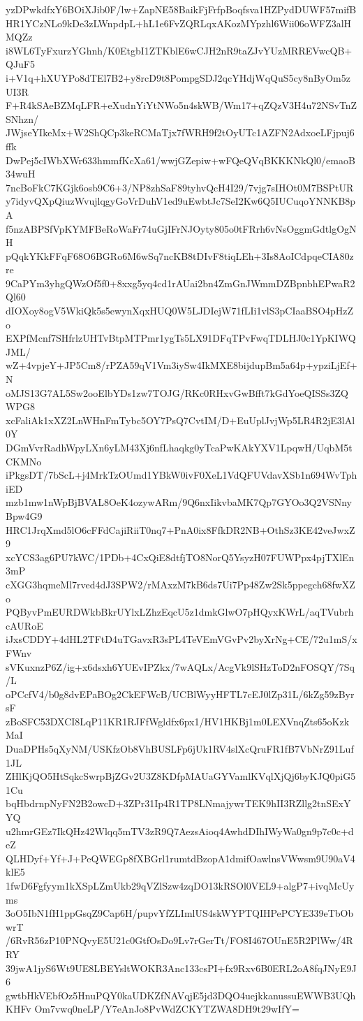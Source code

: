 yzDPwkdfxY6BOiXJib0F/lw+ZapNE58BaikFjFrfpBoqfsva1HZPydDUWF57mifB
HR1YCzNLo9kDe3zLWnpdpL+hL1e6FvZQRLqxAKozMYpzhl6Wii06oWFZ3alHMQZz
i8WL6TyFxurzYGhnh/K0EtgbI1ZTKblE6wCJH2nR9taZJvYUzMRREVwcQB+QJuF5
i+V1q+hXUYPo8dTEl7B2+y8rcD9t8PompgSDJ2qcYHdjWqQuS5cy8nByOm5zUI3R
F+R4kSAeBZMqLFR+eXudnYiYtNWo5n4skWB/Wm17+qZQzV3H4u72NSvTnZSNhzn/
JWjseYIkeMx+W2ShQCp3keRCMaTjx7fWRH9f2tOyUTc1AZFN2AdxoeLFjpuj6ffk
DwPej5cIWbXWr633hmmfKcXa61/wwjGZepiw+wFQeQVqBKKKNkQl0/emaoB34wuH
7ncBoFkC7KGjk6osb9C6+3/NP8zhSaF89tyhvQcH4I29/7vjg7sIHOt0M7BSPtUR
y7idyvQXpQiuzWvujlqgyGoVrDuhV1ed9uEwbtJc7SeI2Kw6Q5IUCuqoYNNKB8pA
f5nzABPSfVpKYMFBeRoWaFr74uGjIFrNJOyty805o0tFRrh6vNsOggmGdtlgOgNH
pQqkYKkFFqF68O6BGRo6M6wSq7ncKB8tDIvF8tiqLEh+3Is8AoICdpqeCIA80zre
9CaPYm3yhgQWzOf5f0+8xxg5yq4cd1rAUai2bn4ZmGnJWmmDZBpnbhEPwaR2Ql60
dIOXoy8ogV5WkiQk5s5ewynXqxHUQ0W5LJDIejW71fLIi1vlS3pCIaaBSO4pHzZo
EXPfMcnf7SHfrlzUHTvBtpMTPmr1ygTs5LX91DFqTPvFwqTDLHJ0c1YpKIWQJML/
wZ+4vpjeY+JP5Cm8/rPZA59qV1Vm3iySw4IkMXE8bijdupBm5a64p+ypziLjEf+N
oMJS13G7AL5Sw2ooElbYDs1zw7TOJG/RKc0RHxvGwBfft7kGdYoeQISSs3ZQWPG8
xcFaliAk1xXZ2LnWHnFmTybc5OY7PsQ7CvtIM/D+EuUplJvjWp5LR4R2jE3lAl0Y
DGmVvrRadhWpyLXn6yLM43Xj6nfLhaqkg0yTcaPwKAkYXV1LpqwH/UqbM5tCKMNo
iPkgsDT/7bScL+j4MrkTzOUmd1YBkW0ivF0XeL1VdQFUVdavXSb1n694WvTphiED
mzb1mw1nWpBjBVAL8OeK4ozywARm/9Q6nxIikvbaMK7Qp7GYOo3Q2VSNnyBpw4G9
HRC1JrqXmd5lO6cFFdCajiRiiT0nq7+PnA0ix8FfkDR2NB+OthSz3KE42veJwxZ9
xcYCS3ag6PU7kWC/1PDb+4CxQiE8dtfjTO8NorQ5YsyzH07FUWPpx4pjTXlEn3mP
cXGG3hqmeMl7rved4dJ3SPW2/rMAxzM7kB6ds7Ui7Pp48Zw2Sk5ppegch68fwXZo
PQByvPmEURDWkbBkrUYlxLZhzEqcU5z1dmkGlwO7pHQyxKWrL/aqTVubrhcAURoE
iJxsCDDY+4dHL2TFtD4uTGavxR3sPL4TeVEmVGvPv2byXrNg+CE/72u1mS/xFWnv
sVKuxnzP6Z/ig+x6dsxh6YUEvIPZkx/7wAQLx/AcgVk9lSHzToD2nFOSQY/7Sq/L
oPCcfV4/b0g8dvEPaBOg2CkEFWcB/UCBlWyyHFTL7cEJ0lZp31L/6kZg59zByrsF
zBoSFC53DXCI8LqP11KR1RJFfWgldfx6px1/HV1HKBj1m0LEXVnqZts65oKzkMaI
DuaDPHs5qXyNM/USKfzOb8VhBUSLFp6jUk1RV4slXcQruFR1fB7VbNrZ91Luf1JL
ZHlKjQO5HtSqkcSwrpBjZGv2U3Z8KDfpMAUaGYVamlKVqlXjQj6byKJQ0piG51Cu
bqHbdrnpNyFN2B2owcD+3ZPr31Ip4R1TP8LNmajywrTEK9hII3RZllg2tnSExYYQ
u2hmrGEz7IkQHz42Wlqq5mTV3zR9Q7AezsAioq4AwhdDIhIWyWa0gn9p7c0c+deZ
QLHDyf+Yf+J+PeQWEGp8fXBGrl1rumtdBzopA1dmifOawlnsVWwsm9U90aV4klE5
1fwD6Fgfyym1kXSpLZmUkb29qVZlSzw4zqDO13kRSOl0VEL9+algP7+ivqMcUyms
3oO5IbN1fH1ppGsqZ9Cap6H/pupvYfZLImlUS4skWYPTQIHPePCYE339eTbObwrT
/6RvR56zP10PNQvyE5U21c0GtfOsDo9Lv7rGerTt/FO8I467OUnE5R2PlWw/4RRY
39jwA1jyS6Wt9UE8LBEYsltWOKR3Anc133csPI+fx9Rxv6B0ERL2oA8fqJNyE9J6
gwtbHkVEbfOz5HnuPQY0kaUDKZfNAVqjE5jd3DQO4uejkkanussuEWWB3UQhKHFv
Om7vwq0neLP/Y7eAnJo8PvWdZCKYTZWA8DH9t29wIfY=
